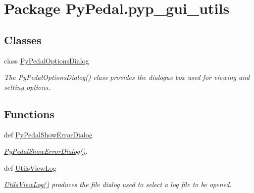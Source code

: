 \hypertarget{namespacePyPedal_1_1pyp__gui__utils}{
\section{Package Py\-Pedal.pyp\_\-gui\_\-utils}
\label{namespacePyPedal_1_1pyp__gui__utils}
}


\subsection*{Classes}
\begin{CompactItemize}
\item 
class \hyperlink{classPyPedal_1_1pyp__gui__utils_1_1PyPedalOptionsDialog}{Py\-Pedal\-Options\-Dialog}
\begin{CompactList}\small\item\em The Py\-Pedal\-Options\-Dialog() class provides the dialogue box used for viewing and setting options. \item\end{CompactList}\end{CompactItemize}
\subsection*{Functions}
\begin{CompactItemize}
\item 
def \hyperlink{namespacePyPedal_1_1pyp__gui__utils_eaf3878d1d73ab889e16f6224639685b}{Py\-Pedal\-Show\-Error\-Dialog}
\begin{CompactList}\small\item\em \hyperlink{namespacePyPedal_1_1pyp__gui__utils_eaf3878d1d73ab889e16f6224639685b}{Py\-Pedal\-Show\-Error\-Dialog()}. \item\end{CompactList}\item 
def \hyperlink{namespacePyPedal_1_1pyp__gui__utils_4506364150a4d59d9fd5154c1e40a029}{Utils\-View\-Log}
\begin{CompactList}\small\item\em \hyperlink{namespacePyPedal_1_1pyp__gui__utils_4506364150a4d59d9fd5154c1e40a029}{Utils\-View\-Log()} produces the file dialog used to select a log file to be opened. \item\end{CompactList}\end{CompactItemize}


